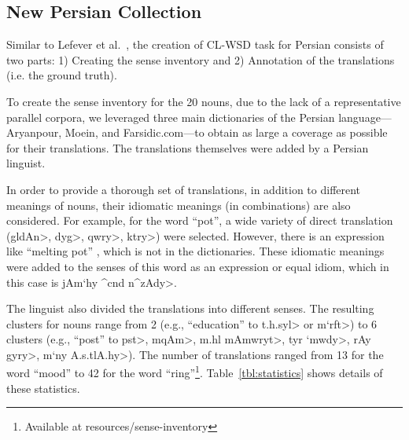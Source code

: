 \vspace{-0.2cm}
\subsection{New Persian Collection} 
Similar to Lefever et al.~, the creation of CL-WSD task for  Persian  consists of two parts: 1) Creating the sense inventory and 2) Annotation of the translations (i.e. the ground truth).

To create the sense inventory for the 20 nouns, due to the lack of a representative parallel corpora, we leveraged three main dictionaries of the Persian language---Aryanpour, Moein, and Farsidic.com---to obtain as large a coverage as possible for their translations. The translations themselves were added by a Persian linguist.

In order to provide a thorough set of translations, in addition to different meanings of nouns,  their idiomatic meanings (in combinations) are also considered. For example, for the word ``pot'', a wide variety of direct translation (\<gldAn>, \<dyg>, \<qwry>, \<ktry>) were selected. However, there is an expression like ``melting pot''%
, which is not in the dictionaries. These idiomatic meanings were added  to the senses of this word as an expression or equal idiom, which in this case is \<jAm`h\hspace{0ex}y ^cnd n^zAdy>.

The linguist also divided the translations into different senses.%
The resulting clusters for nouns range from 2 (e.g., ``education'' to \<t.h.syl> or \<m`rft>) to 6 clusters (e.g., ``post'' to \<pst>, \<mqAm>, \<m.hl mAmwryt>, \<tyr `mwdy>, \<rAy gyry>, \<m`ny A.s.tlA.hy>). The number of translations ranged from 13 for the word ``mood'' to 42 for the word ``ring''\footnote{Available at resources/sense-inventory}. Table~\ref{tbl:statistics} shows details of these statistics.

